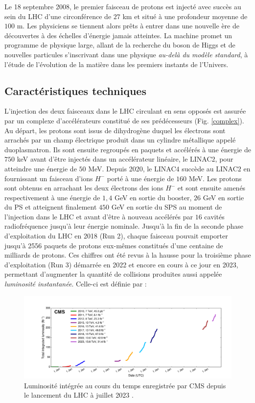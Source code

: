 Le 18 septembre 2008, le premier faisceau de protons est injecté avec succès au sein du LHC d'une circonférence de $27$ km et situé à une profondeur moyenne de $100$ m. Les physiciens se tiennent alors prêts à entrer dans une nouvelle ère de découvertes à des échelles d'énergie jamais atteintes. La machine promet un programme de physique large, allant de la recherche du boson de Higgs et de nouvelles particules s'inscrivant dans une physique \textit{au-delà du modèle standard}, à l'étude de l'évolution de la matière dans les premiers instants de l'Univers.

\subsection{Caractéristiques techniques}

L'injection des deux faisceaux dans le LHC circulant en sens opposés est assurée par un complexe d'accélérateurs constitué de ses prédécesseurs (Fig. \ref{complex}). Au départ, les protons sont issus de dihydrogène duquel les électrons sont arrachés par un champ électrique produit dans un cylindre métallique appelé duoplasmatron. Ils sont ensuite regroupés en paquets et accélérés à une énergie de $750$ keV avant d'être injectés dans un accélérateur linéaire, le LINAC$2$, pour atteindre une énergie de $50$ MeV. Depuis 2020, le LINAC$4$ succède au LINAC$2$ en fournissant un faisceau d'ions $H^-$ porté à une énergie de $160$ MeV. Les protons sont obtenus en arrachant les deux électrons des ions $H^-$ et sont ensuite amenés respectivement à une énergie de $1,4$ GeV en sortie du booster, $26$ GeV en sortie du PS et atteignent finalement $450$ GeV en sortie du SPS au moment de l'injection dans le LHC et avant d'être à nouveau accélérés par $16$ cavités radiofréquence jusqu'à leur énergie nominale. Jusqu'à la fin de la seconde phase d'exploitation du LHC en 2018 (Run 2), chaque faisceau pouvait emporter jusqu'à 2556 paquets de protons eux-mêmes constitués d'une centaine de milliards de protons. Ces chiffres ont été revus à la hausse pour la troisième phase d'exploitation (Run 3) démarrée en 2022 et encore en cours à ce jour en 2023, permettant d'augmenter la quantité de collisions produites aussi appelée \textit{luminosité instantanée}. Celle-ci est définie par : 

\begin{figure}
\centering
    \includegraphics[scale=0.4]{Chapitre3/Images/int_lumi_cumulative_pp_3.png} 
\caption{Luminosité intégrée au cours du temps enregistrée par CMS depuis le lancement du LHC à juillet 2023 \cite{LumiTwiki}.}
\label{lumi}
\end{figure}


